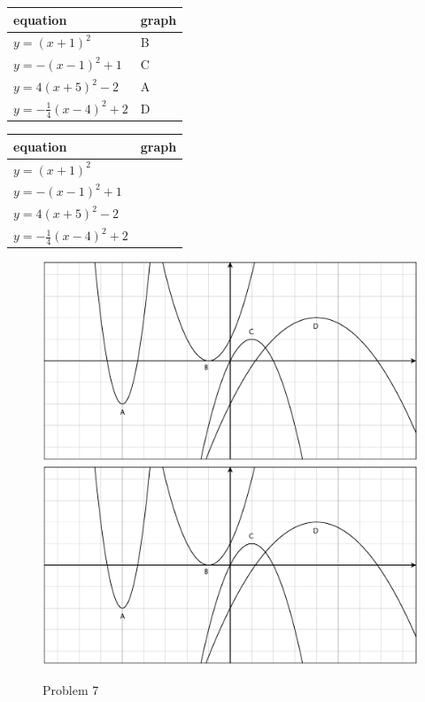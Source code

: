 \documentclass[fleqn,addpoints]{exam}
\begin{document}
\begin{questions}
    \ifprintanswers
      \begin{solution}
        \begin{tabular}{ll}
          \toprule
          equation                         & graph \\
          \midrule
          $y = (x + 1)^2$                  & B     \\
          \midrule
          $y = -(x - 1)^2 + 1$             & C     \\
          \midrule
          $y = 4(x + 5)^2 - 2$             & A     \\
          \midrule
          $y = - \frac{1}{4}(x - 4)^2 + 2$ & D     \\
          \bottomrule
        \end{tabular}
      \end{solution}
    \else
      \begin{tabular}{ll}
        \toprule
        equation                         & graph \\
        \midrule
        $y = (x + 1)^2$                  & \\
        \midrule
        $y = -(x - 1)^2 + 1$             & \\
        \midrule
        $y = 4(x + 5)^2 - 2$             & \\
        \midrule
        $y = - \frac{1}{4}(x - 4)^2 + 2$ & \\
        \bottomrule
      \end{tabular}
    \fi


  \begin{figure}[H]
    \centering
    \ifprintanswers
      \includegraphics[scale=.4]{problem_7.eps}
    \else
      \includegraphics[scale=.6]{problem_7.eps}
    \fi
    \caption*{Problem 7}
  \end{figure}


\end{questions}
\end{document}
